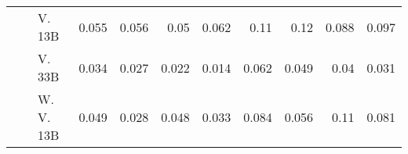 \begin{table}[!htbp]
\begin{tabular}{l|l|l|rrrr|rrrr}
  &  & V. 13B  & {\cellcolor[HTML]{C1D9ED}} \color[HTML]{000000} 0.055 & {\cellcolor[HTML]{BDD7EC}} \color[HTML]{000000} 0.056 & {\cellcolor[HTML]{C9DDF0}} \color[HTML]{000000} 0.05 & {\cellcolor[HTML]{B0D2E7}} \color[HTML]{000000} 0.062 & {\cellcolor[HTML]{FCAA8D}} \color[HTML]{000000} 0.11 & {\cellcolor[HTML]{FCA183}} \color[HTML]{000000} 0.12 & {\cellcolor[HTML]{FCC4AD}} \color[HTML]{000000} 0.088 & {\cellcolor[HTML]{FCB99F}} \color[HTML]{000000} 0.097 \\
  &  & V. 33B  & {\cellcolor[HTML]{DDEAF7}} \color[HTML]{000000} 0.034 & {\cellcolor[HTML]{E7F0FA}} \color[HTML]{000000} 0.027 & {\cellcolor[HTML]{EEF5FC}} \color[HTML]{000000} 0.022 & {\cellcolor[HTML]{F7FBFF}} \color[HTML]{000000} 0.014 & {\cellcolor[HTML]{FEE1D4}} \color[HTML]{000000} 0.062 & {\cellcolor[HTML]{FEE9DF}} \color[HTML]{000000} 0.049 & {\cellcolor[HTML]{FFF0E8}} \color[HTML]{000000} 0.04 & {\cellcolor[HTML]{FFF5F0}} \color[HTML]{000000} 0.031 \\
  &  & W. V. 13B  & {\cellcolor[HTML]{CADEF0}} \color[HTML]{000000} 0.049 & {\cellcolor[HTML]{E6F0F9}} \color[HTML]{000000} 0.028 & {\cellcolor[HTML]{CCDFF1}} \color[HTML]{000000} 0.048 & {\cellcolor[HTML]{DFEBF7}} \color[HTML]{000000} 0.033 & {\cellcolor[HTML]{FDC9B3}} \color[HTML]{000000} 0.084 & {\cellcolor[HTML]{FEE5D8}} \color[HTML]{000000} 0.056 & {\cellcolor[HTML]{FCAA8D}} \color[HTML]{000000} 0.11 & {\cellcolor[HTML]{FDCBB6}} \color[HTML]{000000} 0.081 \\

\bottomrule

\end{tabular}
\setlength{\tabcolsep}{6pt}
\end{table}
